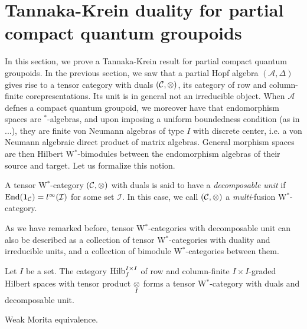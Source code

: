\section{Tannaka-Krein duality for partial compact quantum groupoids}


In this section, we prove a Tannaka-Krein result for partial compact quantum groupoids. In the previous section, we saw that a partial Hopf algebra $(\mathscr{A},\Delta)$ gives rise to a tensor category with duals $(\mathcal{C},\otimes)$, its category of row and column-finite corepresentations. Its unit is in general not an irreducible object. When $\mathscr{A}$ defnes a compact quantum groupoid, we moreover have that endomorphism spaces are $^*$-algebras, and upon imposing a uniform boundedness condition (as in ...), they are finite von Neumann algebras of type $I$ with discrete center, i.e. a von Neumann algebraic direct product of matrix algebras. General morphism spaces are then Hilbert W$^*$-bimodules between the endomorphism algebras of their source and target. Let us formalize this notion. %


\begin{Def} A tensor W$^*$-category $(\mathcal{C},\otimes)$ with duals is said to have a \emph{decomposable unit} if $\operatorname{\mathrm{End}}(\mathbf{1}_{\mathcal{C}}) = l^{\infty}(\mathcal{I})$ for some set $\mathcal{I}$. In this case, we call $(\mathcal{C},\otimes)$ a \emph{multi}-fusion W$^*$-category. %
\end{Def}

As we have remarked before, tensor W$^*$-categories with decomposable unit can also be described as a collection of tensor W$^*$-categories with duality and irreducible units, and a collection of bimodule W$^*$-categories between them. 

\begin{Exa} Let $I$ be a set. The category $\mathrm{Hilb}_f^{I\times I}$ of row and column-finite $I\times I$-graded Hilbert spaces with tensor product $\underset{I}{\otimes}$ forms a tensor W$^*$-category with duals and decomposable unit. 
\end{Exa}

\begin{Exa} Weak Morita equivalence. 
\end{Exa}

